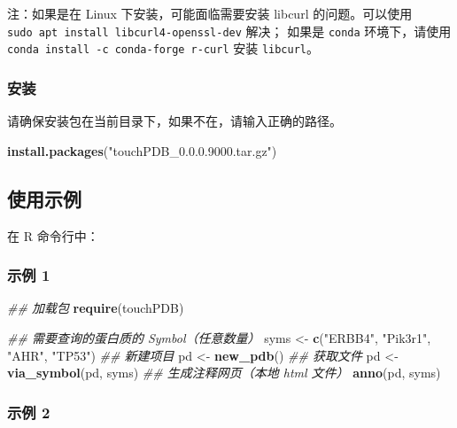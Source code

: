 \documentclass[
]{article}
\newenvironment{Shaded}{\begin{snugshade}}{\end{snugshade}}
\newcommand{\CommentTok}[1]{\textcolor[rgb]{0.56,0.35,0.01}{\textit{#1}}}
\newcommand{\KeywordTok}[1]{\textcolor[rgb]{0.13,0.29,0.53}{\textbf{#1}}}
\newcommand{\NormalTok}[1]{#1}
\newcommand{\StringTok}[1]{\textcolor[rgb]{0.31,0.60,0.02}{#1}}
\begin{document}
注：如果是在 Linux 下安装，可能面临需要安装 libcurl 的问题。可以使用 \texttt{sudo\ apt\ install\ libcurl4-openssl-dev} 解决；
如果是 \texttt{conda} 环境下，请使用 \texttt{conda\ install\ -c\ conda-forge\ r-curl} 安装 \texttt{libcurl}。

\hypertarget{ux5b89ux88c5-1}{%
\subsubsection{安装}\label{ux5b89ux88c5-1}}

请确保安装包在当前目录下，如果不在，请输入正确的路径。

\begin{Shaded}
\begin{Highlighting}[]
\KeywordTok{install.packages}\NormalTok{(}\StringTok{"touchPDB\_0.0.0.9000.tar.gz"}\NormalTok{)}
\end{Highlighting}
\end{Shaded}

\hypertarget{ux4f7fux7528ux793aux4f8b}{%
\subsection{使用示例}\label{ux4f7fux7528ux793aux4f8b}}

在 R 命令行中：

\hypertarget{ins}{%
\subsubsection{示例 1}\label{ins}}

\begin{Shaded}
\begin{Highlighting}[]
\CommentTok{\#\# 加载包}
\KeywordTok{require}\NormalTok{(touchPDB)}

\CommentTok{\#\# 需要查询的蛋白质的 Symbol（任意数量）}
\NormalTok{syms \textless{}{-}}\StringTok{ }\KeywordTok{c}\NormalTok{(}\StringTok{"ERBB4"}\NormalTok{, }\StringTok{"Pik3r1"}\NormalTok{, }\StringTok{"AHR"}\NormalTok{, }\StringTok{"TP53"}\NormalTok{)}
\CommentTok{\#\# 新建项目}
\NormalTok{pd \textless{}{-}}\StringTok{ }\KeywordTok{new\_pdb}\NormalTok{()}
\CommentTok{\#\# 获取文件}
\NormalTok{pd \textless{}{-}}\StringTok{ }\KeywordTok{via\_symbol}\NormalTok{(pd, syms)}
\CommentTok{\#\# 生成注释网页（本地 html 文件）}
\KeywordTok{anno}\NormalTok{(pd, syms)}
\end{Highlighting}
\end{Shaded}

\hypertarget{ux793aux4f8b-2}{%
\subsubsection{示例 2}\label{ux793aux4f8b-2}}
\end{document}

